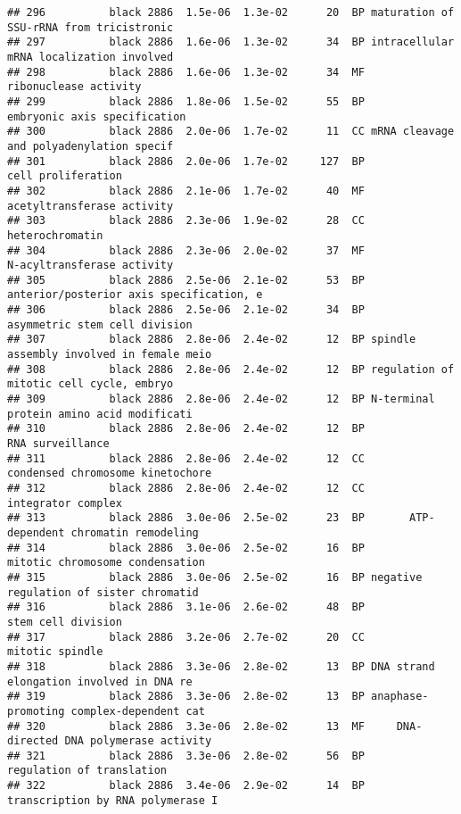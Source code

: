 \documentclass[]{article}
\begin{document}
\begin{verbatim}
## 296          black 2886  1.5e-06  1.3e-02      20  BP maturation of SSU-rRNA from tricistronic
## 297          black 2886  1.6e-06  1.3e-02      34  BP intracellular mRNA localization involved
## 298          black 2886  1.6e-06  1.3e-02      34  MF                    ribonuclease activity
## 299          black 2886  1.8e-06  1.5e-02      55  BP             embryonic axis specification
## 300          black 2886  2.0e-06  1.7e-02      11  CC mRNA cleavage and polyadenylation specif
## 301          black 2886  2.0e-06  1.7e-02     127  BP                       cell proliferation
## 302          black 2886  2.1e-06  1.7e-02      40  MF               acetyltransferase activity
## 303          black 2886  2.3e-06  1.9e-02      28  CC                          heterochromatin
## 304          black 2886  2.3e-06  2.0e-02      37  MF               N-acyltransferase activity
## 305          black 2886  2.5e-06  2.1e-02      53  BP anterior/posterior axis specification, e
## 306          black 2886  2.5e-06  2.1e-02      34  BP            asymmetric stem cell division
## 307          black 2886  2.8e-06  2.4e-02      12  BP spindle assembly involved in female meio
## 308          black 2886  2.8e-06  2.4e-02      12  BP regulation of mitotic cell cycle, embryo
## 309          black 2886  2.8e-06  2.4e-02      12  BP N-terminal protein amino acid modificati
## 310          black 2886  2.8e-06  2.4e-02      12  BP                         RNA surveillance
## 311          black 2886  2.8e-06  2.4e-02      12  CC         condensed chromosome kinetochore
## 312          black 2886  2.8e-06  2.4e-02      12  CC                       integrator complex
## 313          black 2886  3.0e-06  2.5e-02      23  BP       ATP-dependent chromatin remodeling
## 314          black 2886  3.0e-06  2.5e-02      16  BP          mitotic chromosome condensation
## 315          black 2886  3.0e-06  2.5e-02      16  BP negative regulation of sister chromatid 
## 316          black 2886  3.1e-06  2.6e-02      48  BP                       stem cell division
## 317          black 2886  3.2e-06  2.7e-02      20  CC                          mitotic spindle
## 318          black 2886  3.3e-06  2.8e-02      13  BP DNA strand elongation involved in DNA re
## 319          black 2886  3.3e-06  2.8e-02      13  BP anaphase-promoting complex-dependent cat
## 320          black 2886  3.3e-06  2.8e-02      13  MF     DNA-directed DNA polymerase activity
## 321          black 2886  3.3e-06  2.8e-02      56  BP                regulation of translation
## 322          black 2886  3.4e-06  2.9e-02      14  BP        transcription by RNA polymerase I

\end{verbatim}
\end{document}
